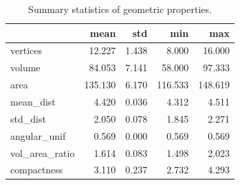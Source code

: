 \begin{table}
\caption{Summary statistics of geometric properties.}
\label{tab:geom-stats}
\begin{tabular}{lrrrr}
\toprule
 & mean & std & min & max \\
\midrule
vertices & 12.227 & 1.438 & 8.000 & 16.000 \\
volume & 84.053 & 7.141 & 58.000 & 97.333 \\
area & 135.130 & 6.170 & 116.533 & 148.619 \\
mean\_dist & 4.420 & 0.036 & 4.312 & 4.511 \\
std\_dist & 2.050 & 0.078 & 1.845 & 2.271 \\
angular\_unif & 0.569 & 0.000 & 0.569 & 0.569 \\
vol\_area\_ratio & 1.614 & 0.083 & 1.498 & 2.023 \\
compactness & 3.110 & 0.237 & 2.732 & 4.293 \\
\bottomrule
\end{tabular}
\end{table}
